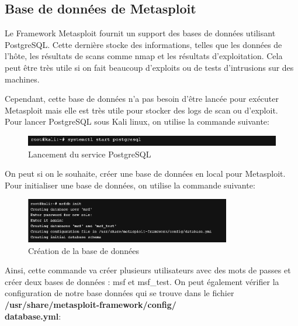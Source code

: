 \subsection{Base de données de Metasploit}
\noindent Le Framework Metasploit fournit un support des bases de données utilisant  PostgreSQL. Cette dernière stocke des informations, telles que les données de l'hôte, les résultats de scans comme nmap et les résultats d'exploitation. Cela peut être très utile si on fait beaucoup d'exploits ou de tests d'intrusions sur des machines.

\noindent Cependant, cette base de données n'a pas besoin d'être lancée pour exécuter Metasploit mais elle est très utile pour stocker des logs de scan ou d'exploit.\\

\noindent Pour lancer PostgreSQL sous Kali linux, on utilise la commande suivante:
\begin{figure}[htp!]
  \centering
  \setlength\figureheight{7cm}
  \setlength\figurewidth{9cm}
  \includegraphics[width=1\textwidth]{oui/Ancien/imangeancien/metasploit/db_launch.PNG}
  \caption{Lancement du service PostgreSQL}
  \label{fig:courbe-tikz}
\end{figure}

\noindent On peut si on le souhaite, créer une base de données en local pour Metasploit. Pour initialiser une base de données, on utilise la commande suivante:

\begin{figure}[htp!]
  \centering
  \setlength\figureheight{7cm}
  \setlength\figurewidth{9cm}
  \includegraphics[width=0.8\textwidth]{oui/Ancien/imangeancien/metasploit/db_init.PNG}
  \caption{Création de la base de données}
  \label{fig:courbe-tikz}
\end{figure}

Ainsi, cette commande va créer plusieurs utilisateurs avec des mots de passes et créer deux bases de données : msf et msf\_test. On peut également vérifier la configuration de notre base données qui se trouve dans le fichier \textbf{/usr/share/metasploit-framework/config/ \\ database.yml}:


